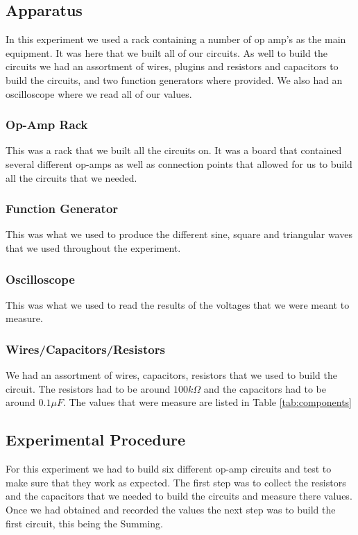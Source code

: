 \subsection{Apparatus}
In this experiment we  used a rack containing a number of op amp’s as the main equipment. It was here that we built all of our circuits. As well to build the circuits we had an assortment of wires, plugins and resistors and capacitors to build the circuits, and two function generators where provided. We also had an oscilloscope where we read all of our values.

\subsubsection{Op-Amp Rack}
\label{sec:e1}
This was a rack that we built all the circuits on. It was a board that contained several different op-amps as well as connection points that allowed for us to build all the circuits that we needed.
\subsubsection{Function Generator}
\label{sec:e1}
This was what we used to produce the different sine, square and triangular waves that we used throughout the experiment.
\subsubsection{Oscilloscope}
\label{sec:e1}
This was what we used to read the results of the voltages that we were meant to measure. 
\subsubsection{Wires/Capacitors/Resistors}
\label{sec:e1}
We had an assortment of wires, capacitors, resistors that we used to build the circuit. The resistors had to be around
$100 k\Omega$ and the capacitors had to be around $0.1\mu F$. The values that were measure are listed in Table \ref{tab:components}

\subsection{Experimental Procedure}

For this experiment we had to build six different op-amp circuits and test to make sure that they work as expected. The first step was to collect the resistors and the capacitors that we needed to build the circuits and measure there values. Once we had obtained and recorded the values the next step was to build the first circuit, this being the Summing. \newline

